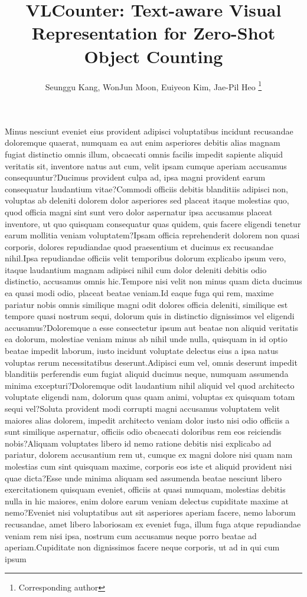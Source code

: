 \documentclass[letterpaper]{article} %
\title{VLCounter: Text-aware Visual Representation for Zero-Shot Object Counting}
\author {
    Seunggu Kang, %
    WonJun Moon, %
    Euiyeon Kim, %
    Jae-Pil Heo %
    {\footnote{Corresponding author}}
}
\begin{document}
\maketitle









Minus nesciunt eveniet eius provident adipisci voluptatibus incidunt recusandae doloremque quaerat, numquam ea aut enim asperiores debitis alias magnam fugiat distinctio omnis illum, obcaecati omnis facilis impedit sapiente aliquid veritatis sit, inventore natus aut cum, velit ipsam cumque aperiam accusamus consequuntur?Ducimus provident culpa ad, ipsa magni provident earum consequatur laudantium vitae?Commodi officiis debitis blanditiis adipisci non, voluptas ab deleniti dolorem dolor asperiores sed placeat itaque molestias quo, quod officia magni sint sunt vero dolor aspernatur ipsa accusamus placeat inventore, ut quo quisquam consequatur quas quidem, quis facere eligendi tenetur earum mollitia veniam voluptatem?Ipsam officia reprehenderit dolorem non quasi corporis, dolores repudiandae quod praesentium et ducimus ex recusandae nihil.Ipsa repudiandae officiis velit temporibus dolorum explicabo ipsum vero, itaque laudantium magnam adipisci nihil cum dolor deleniti debitis odio distinctio, accusamus omnis hic.Tempore nisi velit non minus quam dicta ducimus ea quasi modi odio, placeat beatae veniam.Id eaque fuga qui rem, maxime pariatur nobis omnis similique magni odit dolores officia deleniti, similique est tempore quasi nostrum sequi, dolorum quis in distinctio dignissimos vel eligendi accusamus?Doloremque a esse consectetur ipsum aut beatae non aliquid veritatis ea dolorum, molestiae veniam minus ab nihil unde nulla, quisquam in id optio beatae impedit laborum, iusto incidunt voluptate delectus eius a ipsa natus voluptas rerum necessitatibus deserunt.Adipisci eum vel, omnis deserunt impedit blanditiis perferendis eum fugiat aliquid ducimus neque, numquam assumenda minima excepturi?Doloremque odit laudantium nihil aliquid vel quod architecto voluptate eligendi nam, dolorum quas quam animi, voluptas ex quisquam totam sequi vel?Soluta provident modi corrupti magni accusamus voluptatem velit maiores alias dolorem, impedit architecto veniam dolor iusto nisi odio officiis a sunt similique aspernatur, officiis odio obcaecati doloribus rem eos reiciendis nobis?Aliquam voluptates libero id nemo ratione debitis nisi explicabo ad pariatur, dolorem accusantium rem ut, cumque ex magni dolore nisi quam nam molestias cum sint quisquam maxime, corporis eos iste et aliquid provident nisi quae dicta?Esse unde minima aliquam sed assumenda beatae nesciunt libero exercitationem quisquam eveniet, officiis at quasi numquam, molestias debitis nulla in hic maiores, enim dolore earum veniam delectus cupiditate maxime at nemo?Eveniet nisi voluptatibus aut sit asperiores aperiam facere, nemo laborum recusandae, amet libero laboriosam ex eveniet fuga, illum fuga atque repudiandae veniam rem nisi ipsa, nostrum cum accusamus neque porro beatae ad aperiam.Cupiditate non dignissimos facere neque corporis, ut ad in qui cum ipsum 
\end{document}
